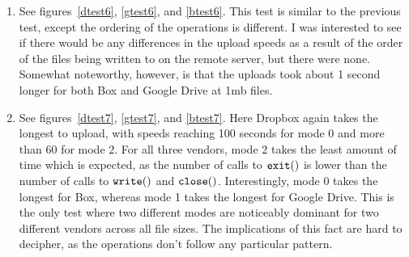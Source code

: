 \documentclass[pageno]{jpaper}
\begin{document}
\begin{enumerate}[label=Test \arabic*:,start=0]
\begin{center}
\CT
{}\quad
{}\quad
{}
\end{center}

\item See figures~\ref{dtest6}, \ref{gtest6}, and \ref{btest6}. This test is similar to the previous test, except the ordering of the operations is different. I was interested to see if there would be any differences in the upload speeds as a result of the order of the files being written to on the remote server, but there were none. Somewhat noteworthy, however, is that the uploads took about 1 second longer for both Box and Google Drive at 1mb files.

\begin{center}
\CT
{}\quad
{}\quad
{}
\end{center}

\item See figures~\ref{dtest7}, \ref{gtest7}, and \ref{btest7}. Here Dropbox again takes the longest to upload, with speeds reaching 100 seconds for mode 0 and more than 60 for mode 2. For all three vendors, mode 2 takes the least amount of time which is expected, as the number of calls to $\tt{exit()}$ is lower than the number of calls to $\tt{write()}$ and $\tt{close()}$. Interestingly, mode 0 takes the longest for Box, whereas mode 1 takes the longest for Google Drive. This is the only test where two different modes are noticeably dominant for two different vendors across all file sizes. The implications of this fact are hard to decipher, as the operations don't follow any particular pattern.

\begin{center}
\CT
{}\quad
{}\quad
{}
\end{center}

\end{enumerate}
\end{document}
